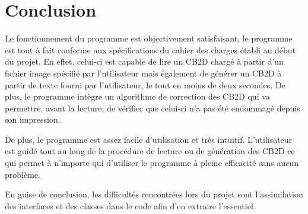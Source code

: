 \section*{Conclusion}

Le fonctionnement du programme est objectivement satisfaisant, le programme est tout à fait conforme aux spécifications du cahier des charges établi au début du projet. En effet, celui-ci est capable de lire un CB2D chargé à partir d'un fichier image spécifié par l'utilisateur mais également de générer un CB2D à partir de texte fourni par l'utilisateur, le tout en moins de deux secondes. De plus, le programme intègre un algorithme de correction des CB2D qui va permettre, avant la lecture, de vérifier que celui-ci n'a pas été endommagé depuis son impression.

De plus, le programme est assez facile d'utilisation et très intuitif. L'utilisateur est guidé tout au long de la procédure de lecture ou de génération des CB2D ce qui permet à n'importe qui d'utiliser le programme à pleine efficacité sans aucun problème.

En guise de conclusion, les difficultés rencontrées lors du projet sont l'assimilation des interfaces et des classes dans le code afin d'en extraire l'essentiel.